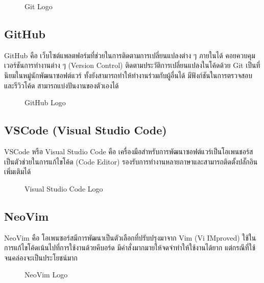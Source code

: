 \begin{figure}[H]
    \centering
    \caption{Git Logo}
    \label{fig:git}
\end{figure}

\subsection{GitHub}

GitHub คือ เว็บไซต์แพลตฟอร์มที่ช่วยในการติดตามการเปลี่ยนแปลงต่าง ๆ ภายในได้ คอยควบคุมเวอร์ชันการทำงานต่าง ๆ (Version Control) ติดตามประวัติการเปลี่ยนแปลงในโค้ดด้วย Git เป็นที่นิยมในหมู่นักพัฒนาซอฟต์แวร์ ทั้งยังสามารถทำให้ทำงานร่วมกับผู้อื่นได้ มีฟังก์ชันในการตรวจสอบและรีวิวโค้ด สามารถแบ่งปันงานของตัวเองได้ \cite{VCSGitHub}

\begin{figure}[H]
    \centering
    \caption{GitHub Logo}
    \label{fig:github}
\end{figure}

\subsection{VSCode (Visual Studio Code)}

VSCode หรือ Visual Studio Code คือ เครื่องมือสำหรับการพัฒนาซอฟต์แวร์เป็นโอเพนชอร์สเป็นตัวช่วยในการแก้ไขโค้ด (Code Editor) รองรับการทำงานหลายภาษาและสามารถติดตั้งปลั๊กอินเพิ่มเติมได้ \cite{KnowVSCode}

\begin{figure}[H]
    \centering
    \caption{Visual Studio Code Logo}
    \label{fig:vscode}
\end{figure}

\subsection{NeoVim}

NeoVim คือ โอเพนซอร์สมีการพัฒนาเป็นตัวเลือกที่ปรับปรุงมาจาก Vim (Vi IMproved) ใช้ในการแก้ไขโค้ดเน้นไปที่การใช้งานด้วยคีบอร์ด มีคำสั่งมากมายให้จดจำทำให้ใช้งานได้ยาก แต่กรณีที่ใช้จนคล่องจะเป็นประโยชน์มาก

\begin{figure}[H]
    \centering
    \caption{NeoVim Logo}
    \label{fig:neovim}
\end{figure}

\newpage


